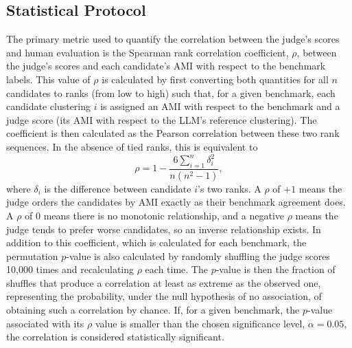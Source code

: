 \documentclass[11pt,a4paper,oneside]{report}
\begin{document}
\subsection{Statistical Protocol}\label{sec:RQ1_STATPROT}

The primary metric used to quantify the correlation between the judge's scores and human evaluation is the Spearman rank correlation coefficient, $\rho$, between the judge's scores and each candidate's AMI with respect to the benchmark labels. This value of $\rho$ is calculated by first converting both quantities for all $n$ candidates to ranks (from low to high) such that, for a given benchmark, each candidate clustering $i$ is assigned an AMI with respect to the benchmark and a judge score (its AMI with respect to the LLM's reference clustering). The coefficient is then calculated as the Pearson correlation between these two rank sequences. In the absence of tied ranks, this is equivalent to
\[
\rho = 1 - \frac{6\sum_{i=1}^{n} \delta_i^{2}}{n(n^{2}-1)},
\]
where $\delta_i$ is the difference between candidate $i$'s two ranks. A $\rho$ of $+1$ means the judge orders the candidates by AMI exactly as their benchmark agreement does. A $\rho$ of $0$ means there is no monotonic relationship, and a negative $\rho$ means the judge tends to prefer worse candidates, so an inverse relationship exists. In addition to this coefficient, which is calculated for each benchmark, the permutation $p$-value is also calculated by randomly shuffling the judge scores 10{,}000 times and recalculating $\rho$ each time. The $p$-value is then the fraction of shuffles that produce a correlation at least as extreme as the observed one, representing the probability, under the null hypothesis of no association, of obtaining such a correlation by chance. If, for a given benchmark, the $p$-value associated with its $\rho$ value is smaller than the chosen significance level, $\alpha = 0.05$, the correlation is considered statistically significant.
\end{document}
